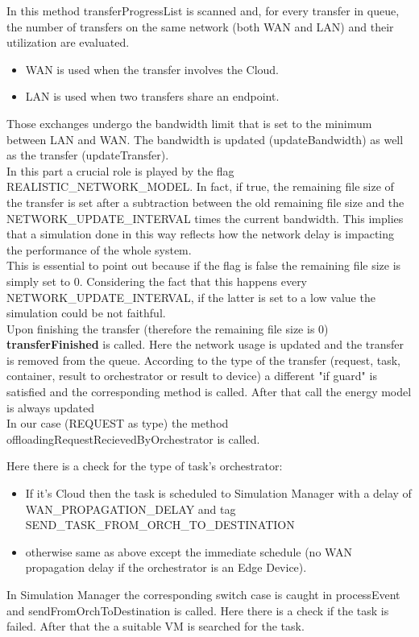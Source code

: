 \documentclass[12pt]{report}
\begin{document}
In this method transferProgressList is scanned and, for every transfer in queue, the number of transfers on the same network (both WAN and LAN) and their utilization are evaluated.
\begin{itemize}
	\item WAN is used when the transfer involves the Cloud.
	\item LAN is used when two transfers share an endpoint.
\end{itemize}
Those exchanges undergo the bandwidth limit that is set to the minimum between LAN and WAN.
The bandwidth is updated (updateBandwidth) as well as the transfer (updateTransfer).\\
In this part a crucial role is played by the flag REALISTIC\_NETWORK\_MODEL. In fact, if true, the remaining file size of the transfer is set after a subtraction between the old remaining file size and the NETWORK\_UPDATE\_INTERVAL times the current bandwidth. This implies that a simulation done in this way reflects how the network delay is impacting the performance of the whole system.\\
This is essential to point out because if the flag is false the remaining file size is simply set to 0. Considering the fact that this happens every NETWORK\_UPDATE\_INTERVAL, if the latter is set to a low value the simulation could be not faithful.\\
Upon finishing the transfer (therefore the remaining file size is 0) \textbf{transferFinished} is called.
Here the network usage is updated and the transfer is removed from the queue.
According to the type of the transfer (request, task, container, result to orchestrator or result to device) a different "if guard" is satisfied and the corresponding method is called. After that call the energy model is always updated\\
In our case (REQUEST as type) the method offloadingRequestRecievedByOrchestrator is called.

Here there is a check for the type of task's orchestrator:
\begin{itemize}
	\item If it's Cloud then the task is scheduled to Simulation Manager with a delay of WAN\_PROPAGATION\_DELAY and tag SEND\_TASK\_FROM\_ORCH\_TO\_DESTINATION
	\item otherwise same as above except the immediate schedule (no WAN propagation delay if the orchestrator is an Edge Device).
\end{itemize}
\vspace{0.5cm}
In Simulation Manager the corresponding switch case is caught in processEvent and sendFromOrchToDestination is called.
Here there is a check if the task is failed. After that the a suitable VM is searched for the task.
\end{document}
